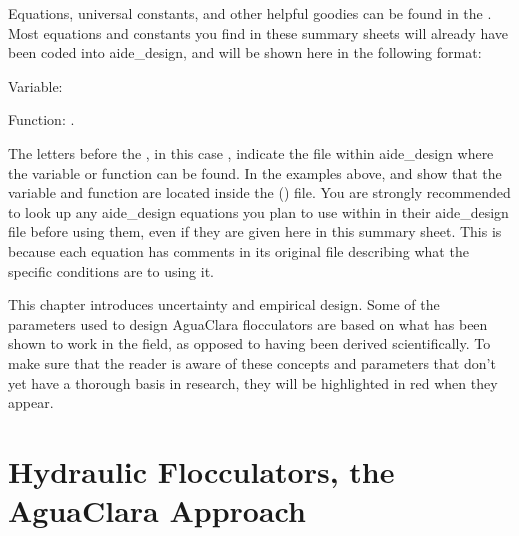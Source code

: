\documentclass[letterpaper,10pt,english]{sphinxmanual}
\begin{document}
Equations, universal constants, and other helpful goodies can be found in the . Most equations and constants you find in these summary sheets will already have been coded into aide\_design, and will be shown here in the following format:

\begin{DUlineblock}{0em}
\item[] Variable: 
\item[] Function: .
\end{DUlineblock}

The letters before the , in this case , indicate the file within aide\_design where the variable or function can be found. In the examples above,  and  show that the variable  and function  are located inside the  () file. You are strongly recommended to look up any aide\_design equations you plan to use within in their aide\_design file before using them, even if they are given here in this summary sheet. This is because each equation has comments in its original file describing what the specific conditions are to using it.

 This chapter introduces uncertainty and empirical design. Some of the parameters used to design AguaClara flocculators are based on what has been shown to work in the field, as opposed to having been derived scientifically. To make sure that the reader is aware of these concepts and parameters that don’t yet have a thorough basis in research, they will be highlighted in red when they appear.


\section{Hydraulic Flocculators, the AguaClara Approach}
\label{\detokenize{Flocculation/Floc_Design:hydraulic-flocculators-the-aguaclara-approach}}
\end{document}
